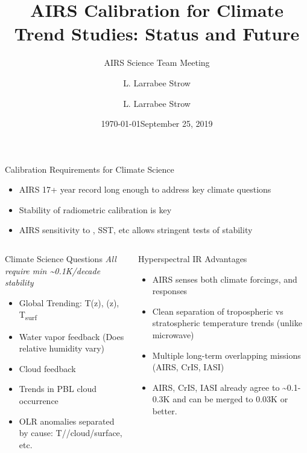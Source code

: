 \documentclass[10pt,t]{beamer}
\author{L. Larrabee Strow}
\date{\today}
\title{\large AIRS Calibration for Climate Trend Studies: Status and Future}
\subtitle{\footnotesize{AIRS Science Team Meeting}}
\date{\vspace{0.1in}\footnotesize{September 25, 2019\vfill}}
\author{L. Larrabee Strow\inst{1,2}}
\institute[UMBC]{\inst{1} UMBC Physics Dept. \and \inst{2}UMBC JCET}
\begin{document}
\maketitle
{}


\begin{frame}[label={sec:org192bf2c},shrink=30]{Calibration Requirements for Climate Science}
\vspace{-0.1in}
\begin{large}
\begin{itemize}
\item AIRS 17+ year record long enough to address key climate questions
\item Stability of radiometric calibration is key
\item AIRS sensitivity to \cd, SST, etc allows stringent tests of stability
\end{itemize}
\end{large}
\vspace{-0.2in}
\begin{columns}
\begin{column}{0.55\columnwidth}
\begin{block}{Climate Science Questions}
\vspace{0.05in}
\emph{All require min \textasciitilde{}0.1K/decade stability}
\vspace{-0.05in}
\begin{itemize}
\item Global Trending: T(z), \water(z), T\textsubscript{surf}
\item Water vapor feedback (Does relative humidity vary)
\item Cloud feedback
\item Trends in PBL cloud occurrence
\item OLR anomalies separated by cause: T/\water/cloud/surface, etc.
\end{itemize}
\end{block}
\end{column}

\begin{column}{0.55\columnwidth}
\begin{block}{Hyperspectral IR Advantages}
\begin{itemize}
\item AIRS senses both climate forcings, and responses
\item Clean separation of tropospheric vs stratospheric temperature trends (unlike microwave)
\item Multiple long-term overlapping missions (AIRS, CrIS, IASI)
\item AIRS, CrIS, IASI already agree to \textasciitilde{}0.1-0.3K and can be merged to 0.03K or better.
\end{itemize}
\end{block}
\end{column}
\end{columns}




\end{frame}
\end{document}
